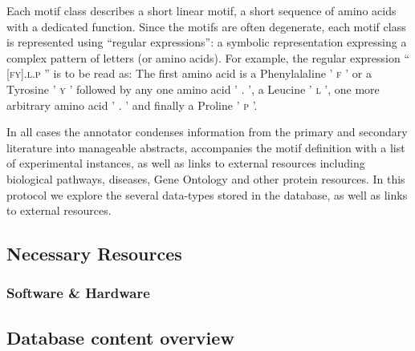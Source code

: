 \documentclass[12pt]{article}
\newcounter{proto}
\newcommand\motif[1]{%
    \textsc{\lowercase{#1}}%
}
\begin{document}
Each motif class describes a short linear motif, a short sequence of amino acids
with a dedicated function. Since the motifs are often degenerate, each motif
class is represented using ``regular expressions'': a symbolic representation
expressing a complex pattern of letters (or amino acids). For example, the
regular expression ``\motif{[FY].L.P}'' is to be read as: The first amino acid
is a Phenylalaline '\motif{F}' or a Tyrosine '\motif{Y}' followed by any one
amino acid '\motif{.}', a Leucine '\motif{L}', one more arbitrary amino acid
'\motif{.}' and finally a Proline '\motif{P}'.

In all cases the annotator condenses information from the primary and secondary
literature into manageable abstracts, accompanies the motif definition with
a list of experimental instances, as well as links to external resources including
biological pathways, diseases, Gene Ontology and other protein resources. In
this protocol we explore the several data-types stored in the database, as well
as links to external resources.

%
%
\subsection*{Necessary Resources}
\subsubsection*{Software \& Hardware}



%
%
\subsection*{Database content overview}%
\label{subsec:explore_content_database}%
\end{document}

